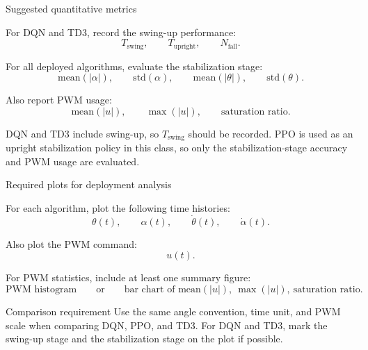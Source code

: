 \documentclass[aspectratio=169]{beamer}
\begin{document}
\begin{frame}{Suggested quantitative metrics}

For DQN and TD3, record the swing-up performance:
\[
T_{\mathrm{swing}},
\qquad
T_{\mathrm{upright}},
\qquad
N_{\mathrm{fall}}.
\]

\vspace{0.15cm}

For all deployed algorithms, evaluate the stabilization stage:
\[
\mathrm{mean}(|\alpha|),
\qquad
\mathrm{std}(\alpha),
\qquad
\mathrm{mean}(|\theta|),
\qquad
\mathrm{std}(\theta).
\]

\vspace{0.15cm}

Also report PWM usage:
\[
\mathrm{mean}(|u|),
\qquad
\max(|u|),
\qquad
\text{saturation ratio}.
\]

\vspace{0.12cm}


DQN and TD3 include swing-up, so \(T_{\mathrm{swing}}\) should be recorded.
PPO is used as an upright stabilization policy in this class, so only the stabilization-stage accuracy and PWM usage are evaluated.


\end{frame}


\begin{frame}{Required plots for deployment analysis}

For each algorithm, plot the following time histories:
\[
\theta(t),\qquad
\alpha(t),
\qquad
\dot{\theta}(t),
\qquad
\dot{\alpha}(t).
\]

\vspace{0.18cm}

Also plot the PWM command:
\[
u(t).
\]

\vspace{0.18cm}

For PWM statistics, include at least one summary figure:
\[
\text{PWM histogram}
\qquad \text{or} \qquad
\text{bar chart of } \mathrm{mean}(|u|),\ \max(|u|),\ \text{saturation ratio}.
\]

\vspace{0.15cm}

\begin{alertblock}{Comparison requirement}
\small
Use the same angle convention, time unit, and PWM scale when comparing DQN, PPO, and TD3.
For DQN and TD3, mark the swing-up stage and the stabilization stage on the plot if possible.
\end{alertblock}

\end{frame}
\end{document}
